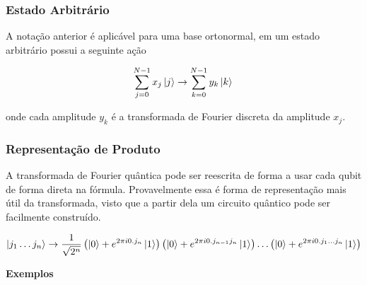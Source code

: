 \subsubsection{Estado Arbitrário}\label{subsubsec:estado-arbitrario}

A notação anterior é aplicável para uma base ortonormal, em um estado
arbitrário possui a seguinte ação

\[
    \sum_{j=0}^{N-1} x_j \ket{j} \to \sum_{k=0}^{N-1} y_k \ket{k} \\
\]

onde cada amplitude \(y_k\) é a transformada de Fourier discreta da
amplitude \(x_j\).

\subsubsection{Representação de Produto}\label{subsubsec:representacao-de-produto}

A transformada de Fourier quântica pode ser reescrita de forma a usar
cada qubit de forma direta na fórmula.
Provavelmente essa é forma de representação mais útil da transformada, visto que a partir dela um
circuito quântico pode ser facilmente construído.

\[
    \ket{j_1 \dots j_n} \to \dfrac{1}{\sqrt{2^n}} \left( \ket{0} + e^{2 \pi i 0.j_n}\ket{1} \right) \left( \ket{0} + e^{2 \pi i 0.j_{n-1}j_n}\ket{1} \right) \dots \left( \ket{0} + e^{2 \pi i 0.j_1 \dots j_n}\ket{1} \right)
\]

\textbf{Exemplos}


